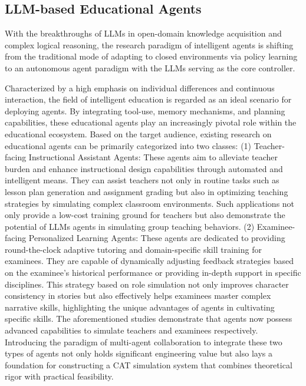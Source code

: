 \subsection{LLM-based Educational Agents}
With the breakthroughs of  LLMs in open-domain knowledge acquisition and complex logical reasoning, the research paradigm of intelligent agents is shifting from the traditional mode of adapting to closed environments via policy learning to an autonomous agent paradigm with the LLMs serving as the core controller\cite{vill10648793,yang11192789}.

Characterized by a high emphasis on individual differences and continuous interaction, the field of intelligent education is regarded as an ideal scenario for deploying agents\cite{xi2025investigating,wang2025llm}. By integrating tool-use, memory mechanisms, and planning capabilities, these educational agents play an increasingly pivotal role within the educational ecosystem\cite{yu2025simulated,HaoCLYLZ26,ZhengSG26,XiZW26}. Based on the target audience, existing research on educational agents can be primarily categorized into two classes\cite{chu-etal-2025-llm}: (1) Teacher-facing Instructional Assistant Agents: These agents aim to alleviate teacher burden and enhance instructional design capabilities through automated and intelligent means. They can assist teachers not only in routine tasks such as lesson plan generation\cite{hu2025exploring} and assignment grading but also in optimizing teaching strategies by simulating complex classroom environments\cite{zhang2025simulating}. Such applications not only provide a low-cost training ground for teachers but also demonstrate the potential of LLMs agents in simulating group teaching behaviors. (2) Examinee-facing Personalized Learning Agents: These agents are dedicated to providing round-the-clock adaptive tutoring and domain-specific skill training for examinees. They are capable of dynamically adjusting feedback strategies based on the examinee's historical performance or providing in-depth support in specific disciplines\cite{rogers2025playing,NguyenPGTS25}. This strategy based on role simulation not only improves character consistency in stories but also effectively helps examinees master complex narrative skills, highlighting the unique advantages of agents in cultivating specific skills\cite{wei2025igniting,fu11204697}. The aforementioned studies demonstrate that agents now possess advanced capabilities to simulate teachers and examinees respectively. Introducing the paradigm of multi-agent collaboration\cite{qian2025scaling} to integrate these two types of agents not only holds significant engineering value but also lays a foundation for constructing a CAT simulation system that combines theoretical rigor with practical feasibility.


